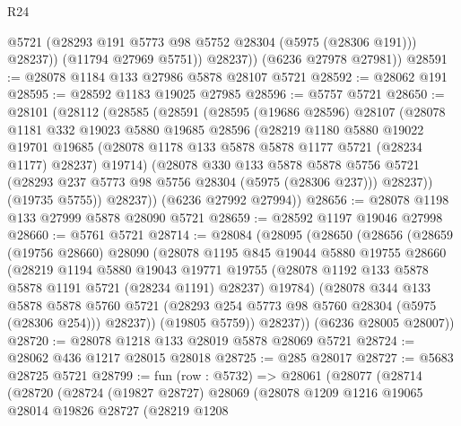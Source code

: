 \begin{lexlean}{R24}
\begin{coremodule}
                @5721
                (@28293 @191 @5773 @98 @5752 @28304 (@5975 (@28306 @191)))
                @28237))
            (@11794 @27969 @5751))
          @28237))
      (@6236 @27978 @27981))
@28591 := @28078 @1184 @133 @27986 @5878 @28107 @5721
@28592 := @28062 @191
@28595 := @28592 @1183 @19025 @27985
@28596 := @5757 @5721
@28650 := @28101
    (@28112
      (@28585
        (@28591
          (@28595
            (@19686 @28596)
            @28107
            (@28078
              @1181
              @332
              @19023
              @5880
              @19685
              @28596
              (@28219
                @1180
                @5880
                @19022
                @19701
                @19685
                (@28078 @1178 @133 @5878 @5878 @1177 @5721 (@28234 @1177) @28237)
                @19714)
              (@28078
                @330
                @133
                @5878
                @5878
                @5756
                @5721
                (@28293 @237 @5773 @98 @5756 @28304 (@5975 (@28306 @237)))
                @28237))
            (@19735 @5755))
          @28237))
      (@6236 @27992 @27994))
@28656 := @28078 @1198 @133 @27999 @5878 @28090 @5721
@28659 := @28592 @1197 @19046 @27998
@28660 := @5761 @5721
@28714 := @28084
    (@28095
      (@28650
        (@28656
          (@28659
            (@19756 @28660)
            @28090
            (@28078
              @1195
              @845
              @19044
              @5880
              @19755
              @28660
              (@28219
                @1194
                @5880
                @19043
                @19771
                @19755
                (@28078 @1192 @133 @5878 @5878 @1191 @5721 (@28234 @1191) @28237)
                @19784)
              (@28078
                @344
                @133
                @5878
                @5878
                @5760
                @5721
                (@28293 @254 @5773 @98 @5760 @28304 (@5975 (@28306 @254)))
                @28237))
            (@19805 @5759))
          @28237))
      (@6236 @28005 @28007))
@28720 := @28078 @1218 @133 @28019 @5878 @28069 @5721
@28724 := @28062 @436 @1217 @28015 @28018
@28725 := @285 @28017
@28727 := @5683 @28725 @5721
@28799 := fun (row : @5732) =>
  @28061
    (@28077
      (@28714
        (@28720
          (@28724
            (@19827 @28727)
            @28069
            (@28078
              @1209
              @1216
              @19065
              @28014
              @19826
              @28727
              (@28219
                @1208

\end{coremodule}
\end{lexlean}

